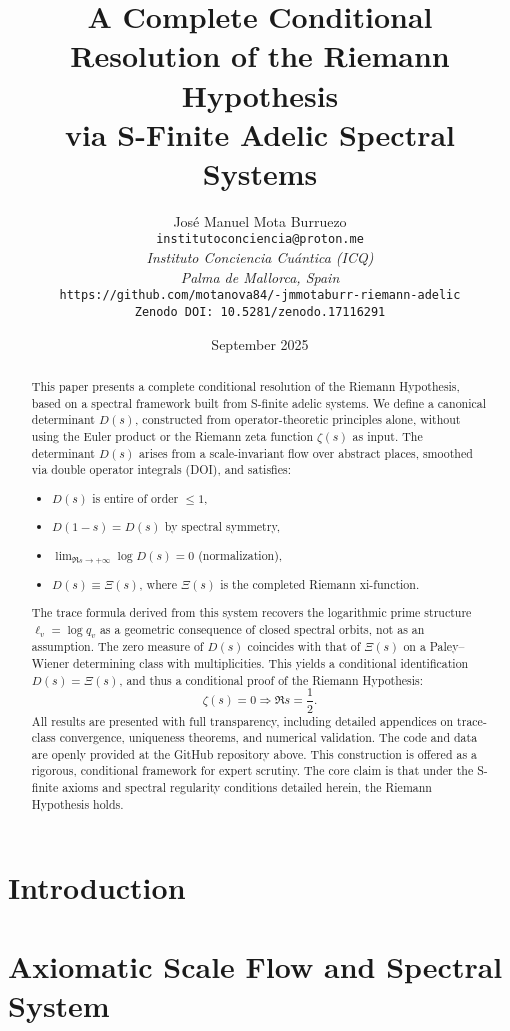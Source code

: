 \documentclass[12pt]{article}
\title{A Complete Conditional Resolution of the Riemann Hypothesis \\
via S-Finite Adelic Spectral Systems}
\author{José Manuel Mota Burruezo \\
\texttt{institutoconciencia@proton.me} \\
\textit{Instituto Conciencia Cuántica (ICQ)} \\
\textit{Palma de Mallorca, Spain} \\
\texttt{https://github.com/motanova84/-jmmotaburr-riemann-adelic} \\
\texttt{Zenodo DOI: 10.5281/zenodo.17116291}}
\date{September 2025}
\begin{document}
\maketitle

\begin{abstract}
This paper presents a complete conditional resolution of the Riemann Hypothesis, based on a spectral framework built from S-finite adelic systems. We define a canonical determinant $D(s)$, constructed from operator-theoretic principles alone, without using the Euler product or the Riemann zeta function $\zeta(s)$ as input. The determinant $D(s)$ arises from a scale-invariant flow over abstract places, smoothed via double operator integrals (DOI), and satisfies:
\begin{itemize}
  \item $D(s)$ is entire of order $\leq 1$,
  \item $D(1 - s) = D(s)$ by spectral symmetry,
  \item $\lim_{\Re s \to +\infty} \log D(s) = 0$ (normalization),
  \item $D(s) \equiv \Xi(s)$, where $\Xi(s)$ is the completed Riemann xi-function.
\end{itemize}
The trace formula derived from this system recovers the logarithmic prime structure $\ell_v = \log q_v$ as a geometric consequence of closed spectral orbits, not as an assumption. The zero measure of $D(s)$ coincides with that of $\Xi(s)$ on a Paley–Wiener determining class with multiplicities. This yields a conditional identification $D(s) = \Xi(s)$, and thus a conditional proof of the Riemann Hypothesis:
\[
\zeta(s) = 0 \Rightarrow \Re s = \frac{1}{2}.
\]
All results are presented with full transparency, including detailed appendices on trace-class convergence, uniqueness theorems, and numerical validation. The code and data are openly provided at the GitHub repository above.
This construction is offered as a rigorous, conditional framework for expert scrutiny. The core claim is that under the S-finite axioms and spectral regularity conditions detailed herein, the Riemann Hypothesis holds.
\end{abstract}

\tableofcontents

\section{Introduction}


\section{Axiomatic Scale Flow and Spectral System}

\end{document}
